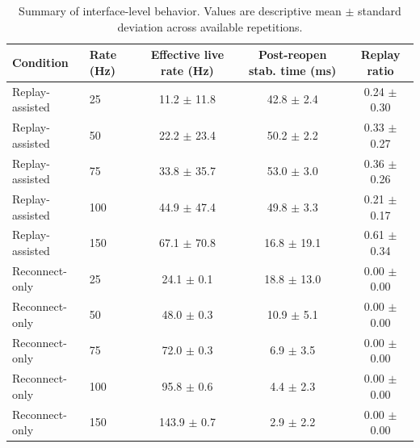 \begin{table}[t]
\centering
\caption{Summary of interface-level behavior. Values are descriptive mean $\pm$ standard deviation across available repetitions.}
\label{tab:summary_results_updated}
\scriptsize
\begin{tabular}{llccc}
\hline
Condition & Rate (Hz) & Effective live rate (Hz) & Post-reopen stab. time (ms) & Replay ratio \\
\hline
Replay-assisted & 25 & 11.2 $\pm$ 11.8 & 42.8 $\pm$ 2.4 & 0.24 $\pm$ 0.30 \\
Replay-assisted & 50 & 22.2 $\pm$ 23.4 & 50.2 $\pm$ 2.2 & 0.33 $\pm$ 0.27 \\
Replay-assisted & 75 & 33.8 $\pm$ 35.7 & 53.0 $\pm$ 3.0 & 0.36 $\pm$ 0.26 \\
Replay-assisted & 100 & 44.9 $\pm$ 47.4 & 49.8 $\pm$ 3.3 & 0.21 $\pm$ 0.17 \\
Replay-assisted & 150 & 67.1 $\pm$ 70.8 & 16.8 $\pm$ 19.1 & 0.61 $\pm$ 0.34 \\
Reconnect-only & 25 & 24.1 $\pm$ 0.1 & 18.8 $\pm$ 13.0 & 0.00 $\pm$ 0.00 \\
Reconnect-only & 50 & 48.0 $\pm$ 0.3 & 10.9 $\pm$ 5.1 & 0.00 $\pm$ 0.00 \\
Reconnect-only & 75 & 72.0 $\pm$ 0.3 & 6.9 $\pm$ 3.5 & 0.00 $\pm$ 0.00 \\
Reconnect-only & 100 & 95.8 $\pm$ 0.6 & 4.4 $\pm$ 2.3 & 0.00 $\pm$ 0.00 \\
Reconnect-only & 150 & 143.9 $\pm$ 0.7 & 2.9 $\pm$ 2.2 & 0.00 $\pm$ 0.00 \\
\hline
\end{tabular}
\end{table}